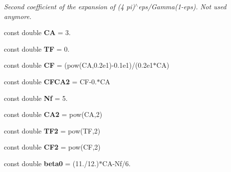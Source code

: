\begin{DoxyCompactItemize}
\begin{DoxyCompactList}\small\item\em Second coefficient of the expansion of (4 pi)$^\wedge$eps/\+Gamma(1-\/eps). Not used anymore. \end{DoxyCompactList}\item 
\hypertarget{namespaceConstants_ac73849b0c8547416415eef1a561ce0e8}{}const double {\bfseries C\+A} = 3.\label{namespaceConstants_ac73849b0c8547416415eef1a561ce0e8}

\item 
\hypertarget{namespaceConstants_a073f635ee60b7f307aea7d44e8112ab7}{}const double {\bfseries T\+F} = 0.\label{namespaceConstants_a073f635ee60b7f307aea7d44e8112ab7}

\item 
\hypertarget{namespaceConstants_a5010b233cf194ebca5d8054e1749079f}{}const double {\bfseries C\+F} = (pow(C\+A,0.\+2e1)-\/0.\+1e1)/(0.\+2e1$\ast$\+C\+A)\label{namespaceConstants_a5010b233cf194ebca5d8054e1749079f}

\item 
\hypertarget{namespaceConstants_adc8499196efd507f12a0189cdfcfef1b}{}const double {\bfseries C\+F\+C\+A2} = C\+F-\/0.$\ast$C\+A\label{namespaceConstants_adc8499196efd507f12a0189cdfcfef1b}

\item 
\hypertarget{namespaceConstants_abe9c015febc2c7bb30cb74a78d1e2a0b}{}const double {\bfseries Nf} = 5.\label{namespaceConstants_abe9c015febc2c7bb30cb74a78d1e2a0b}

\item 
\hypertarget{namespaceConstants_af447d28502b99a76b64aff04ae71b8ea}{}const double {\bfseries C\+A2} = pow(C\+A,2)\label{namespaceConstants_af447d28502b99a76b64aff04ae71b8ea}

\item 
\hypertarget{namespaceConstants_a826a73ef55ac5464617f400a407ea8c5}{}const double {\bfseries T\+F2} = pow(T\+F,2)\label{namespaceConstants_a826a73ef55ac5464617f400a407ea8c5}

\item 
\hypertarget{namespaceConstants_ab40e0fa2fdc3d4fddddf47cce359ce35}{}const double {\bfseries C\+F2} = pow(C\+F,2)\label{namespaceConstants_ab40e0fa2fdc3d4fddddf47cce359ce35}

\item 
\hypertarget{namespaceConstants_aa5c1145687461e3b3b03a749e820bae8}{}const double {\bfseries beta0} = (11./12.)$\ast$C\+A-\/Nf/6.\label{namespaceConstants_aa5c1145687461e3b3b03a749e820bae8}


\end{DoxyCompactItemize}
